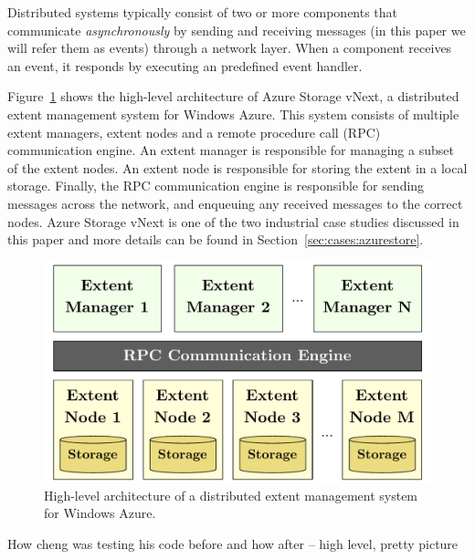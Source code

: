 Distributed systems typically consist of two or more components that communicate \emph{asynchronously} by sending and receiving messages (in this paper we will refer them as events) through a network layer. When a component receives an event, it responds by executing an predefined event handler.

Figure~\ref{fig:azurestore} shows the high-level architecture of Azure Storage vNext, a distributed extent management system for Windows Azure. This system consists of multiple extent managers, extent nodes and a remote procedure call (RPC) communication engine. An extent manager is responsible for managing a subset of the extent nodes. An extent node is responsible for storing the extent in a local storage. Finally, the RPC communication engine is responsible for sending messages across the network, and enqueuing any received messages to the correct nodes. Azure Storage vNext is one of the two industrial case studies discussed in this paper and more details can be found in Section~\ref{sec:cases:azurestore}.

\begin{figure}[t]
\centering
\includegraphics[width=\linewidth]{img/azurestore}
\caption{High-level architecture of a distributed extent management system for Windows Azure.}
\label{fig:azurestore}
\end{figure}

How cheng was testing his code before and how after -- high level, pretty picture
